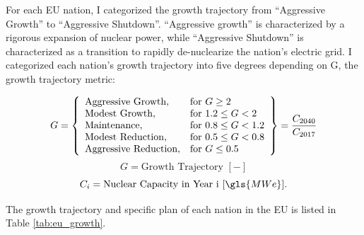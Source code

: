 \FloatBarrier

For each \gls{EU} nation, I categorized the growth trajectory from
``Aggressive Growth'' to ``Aggressive Shutdown''. ``Aggressive growth'' is
characterized by a rigorous expansion of nuclear power, while
``Aggressive Shutdown'' is characterized as a transition to rapidly
de-nuclearize the nation's electric grid. I categorized each nation's growth 
trajectory into five degrees depending on G, the growth trajectory metric:

 \[
 G = \left\{\begin{array}{ll}
 \text{Aggressive Growth}, & \text{for } G \geq 2\\
 \text{Modest Growth}, & \text{for } 1.2 \leq G < 2\\
 \text{Maintenance}, & \text{for } 0.8 \leq G < 1.2 \\
 \text{Modest Reduction}, & \text{for } 0.5 \leq G< 0.8\\
 \text{Aggressive Reduction}, & \text{for } G \leq 0.5
 \end{array}\right\} = \frac{C_{2040}}{C_{2017}}\\\\
 \]
 \[
  G = \text{Growth Trajectory  } [-] 
 \]
 \[
 C_{i} = \text{Nuclear Capacity in Year i  } [\gls{MWe}].
 \]

The growth trajectory and specific plan of each nation in the \gls{EU} 
is listed in Table \ref{tab:eu_growth}.  

